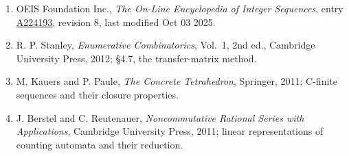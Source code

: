 \documentclass[11pt]{article}
\theoremstyle{definition}
\begin{document}
\begin{enumerate}

\item OEIS Foundation Inc., \emph{The On-Line Encyclopedia of Integer Sequences}, entry \href{https://oeis.org/A224193}{A224193}, revision 8, last modified Oct 03 2025.

\item R. P. Stanley, \emph{Enumerative Combinatorics}, Vol.~1, 2nd ed., Cambridge University Press, 2012; \S4.7, the transfer-matrix method.

\item M. Kauers and P. Paule, \emph{The Concrete Tetrahedron}, Springer, 2011; C-finite sequences and their closure properties.

\item J. Berstel and C. Reutenauer, \emph{Noncommutative Rational Series with Applications}, Cambridge University Press, 2011; linear representations of counting automata and their reduction.

\end{enumerate}
\end{document}
